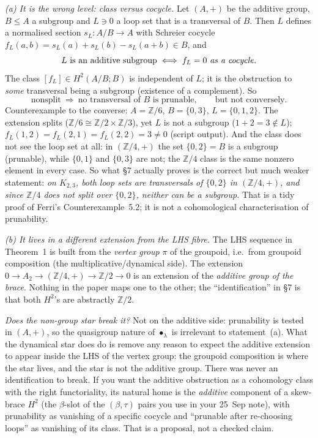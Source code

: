 \documentclass[11pt]{article}
\newcommand{\Z}{\mathbb{Z}}
\begin{document}
\emph{(a) It is the wrong level: class versus cocycle.} Let $(A,+)$ be the additive
group, $B\le A$ a subgroup and $L\ni0$ a loop set that is a transversal of $B$. Then
$L$ defines a normalised section $s_L:A/B\to A$ with Schreier cocycle
$f_L(a,b)=s_L(a)+s_L(b)-s_L(a+b)\in B$, and
\[
L\text{ is an additive subgroup}\iff f_L=0\ \text{\emph{as a cocycle}}.
\]
The class $[f_L]\in H^2(A/B;B)$ is independent of $L$; it is the obstruction to
\emph{some} transversal being a subgroup (existence of a complement). So
\[
\text{nonsplit}\ \Longrightarrow\ \text{no transversal of $B$ is prunable},
\qquad\text{but not conversely.}
\]
Counterexample to the converse: $A=\Z/6$, $B=\{0,3\}$, $L=\{0,1,2\}$. The extension
splits ($\Z/6\cong\Z/2\times\Z/3$), yet $L$ is not a subgroup ($1+2=3\notin L$);
$f_L(1,2)=f_L(2,1)=f_L(2,2)=3\neq0$ (script output). And the class does not see the
loop set at all: in $(\Z/4,+)$ the set $\{0,2\}=B$ is a subgroup (prunable), while
$\{0,1\}$ and $\{0,3\}$ are not; the $\Z/4$ class is the same nonzero element in
every case. So what \S7 actually proves is the correct but much weaker statement:
\emph{on $K_{2,3}$, both loop sets are transversals of $\{0,2\}$ in $(\Z/4,+)$, and
since $\Z/4$ does not split over $\{0,2\}$, neither can be a subgroup.} That is a
tidy proof of Ferri's Counterexample~5.2; it is not a cohomological
characterisation of prunability.

\emph{(b) It lives in a different extension from the LHS fibre.} The LHS sequence
in Theorem~1 is built from the \emph{vertex group} $\pi$ of the groupoid, i.e.\ from
groupoid composition (the multiplicative/dynamical side). The extension
$0\to A_2\to(\Z/4,+)\to\Z/2\to0$ is an extension of the \emph{additive group of the
brace}. Nothing in the paper maps one to the other; the ``identification'' in \S7
is that both $H^2$'s are abstractly $\Z/2$.

\emph{Does the non-group star break it?} Not on the additive side: prunability is
tested in $(A,+)$, so the quasigroup nature of $\bullet_\lambda$ is irrelevant to
statement~(a). What the dynamical star does do is remove any reason to expect the
additive extension to appear inside the LHS of the vertex group: the groupoid
composition is where the star lives, and the star is not the additive group.
There was never an identification to break. If you want the additive obstruction
as a cohomology class with the right functoriality, its natural home is the
\emph{additive} component of a skew-brace $H^2$ (the $\beta$-slot of the
$(\beta,\tau)$ pairs you use in your 25~Sep note), with prunability as vanishing
of a specific cocycle and ``prunable after re-choosing loops'' as vanishing of its
class. That is a proposal, not a checked claim.
\end{document}
